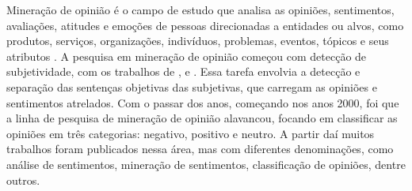 \documentclass[template.tex]{subfiles}
\begin{document}
%
%
%
%

Mineração de opinião é o campo de estudo que analisa as opiniões, sentimentos, avaliações, atitudes e emoções de pessoas direcionadas a entidades ou alvos, como produtos, serviços, organizações, indivíduos, problemas, eventos, tópicos e seus atributos \cite{bing:2012}. A pesquisa em mineração de opinião começou com detecção de subjetividade, com os trabalhos de ,  e .  Essa tarefa envolvia a detecção e separação das sentenças objetivas das subjetivas, que carregam as opiniões e sentimentos atrelados. Com o passar dos anos, começando nos anos 2000, foi que a linha de pesquisa de mineração de opinião alavancou, focando em classificar as opiniões em três categorias: negativo, positivo e neutro. A partir daí muitos trabalhos foram publicados nessa área, mas com diferentes denominações, como análise de sentimentos, mineração de sentimentos, classificação de opiniões, dentre outros. 
\end{document}
